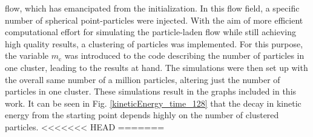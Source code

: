 \documentclass[11pt,a4paper,openany,oneside,parskip=half*]{article}
\begin{document}
flow, which has emancipated from the initialization. In this flow field, a specific number of spherical point-particles were injected. 
\newline
\newline
With the aim of more efficient computational effort for simulating the particle-laden flow while still achieving high quality results, a clustering of particles was implemented. For this purpose, the variable $m_\mathrm{c}$ was introduced to the code describing the number of particles in one cluster, leading to the results at hand. The simulations were then set up with the overall same number of  a million particles, altering just the number of particles in one cluster. These simulations result in the graphs included in this work. 
It can be seen in Fig. \ref{kineticEnergy_time_128} that the decay in kinetic energy from the starting point depends highly on the number of clustered particles.
<<<<<<< HEAD
=======
\end{document}
